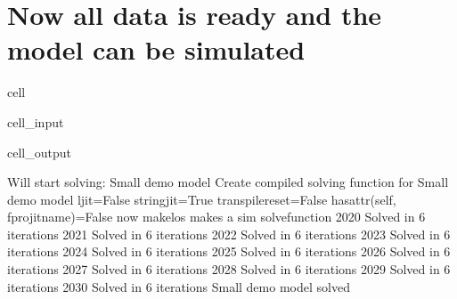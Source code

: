 \documentclass[letterpaper,10pt,english]{jupyterBook}
\begin{document}
\section{Now all data is ready and the model can be simulated}
\label{\detokenize{content/howto/smallmodel/modelstart:now-all-data-is-ready-and-the-model-can-be-simulated}}
\begin{sphinxuseclass}{cell}\begin{sphinxVerbatimInput}

\begin{sphinxuseclass}{cell_input}
\begin{sphinxVerbatim}[commandchars=\\\{\}]
  
   
\end{sphinxVerbatim}

\end{sphinxuseclass}\end{sphinxVerbatimInput}
\begin{sphinxVerbatimOutput}

\begin{sphinxuseclass}{cell_output}
\begin{sphinxVerbatim}[commandchars=\\\{\}]
Will start solving: Small demo model
Create compiled solving function for Small demo model
ljit=False stringjit=True  transpile\PYGZus{}reset=False  hasattr(self, f\PYGZdq{}pro\PYGZus{}\PYGZob{}jitname\PYGZcb{}\PYGZdq{})=False
now makelos makes a sim solvefunction
2020 Solved in 6 iterations
2021 Solved in 6 iterations
2022 Solved in 6 iterations
2023 Solved in 6 iterations
2024 Solved in 6 iterations
2025 Solved in 6 iterations
2026 Solved in 6 iterations
2027 Solved in 6 iterations
2028 Solved in 6 iterations
2029 Solved in 6 iterations
2030 Solved in 6 iterations
Small demo model solved  
\end{sphinxVerbatim}

\end{sphinxuseclass}\end{sphinxVerbatimOutput}

\end{sphinxuseclass}
\end{document}
